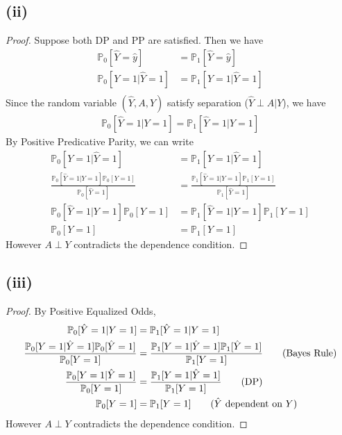 \documentclass[twoside,11pt]{homework}
\begin{document}
 \subsection*{(ii)}
 	\begin{proof}
 		Suppose both DP and PP are satisfied.
 		Then we have
 		\begin{align*}
 			\mathbb{P}_0[\hat{Y}=\hat{y}] &= \mathbb{P}_1 [\hat{Y}=\hat{y}] \tag{DP} \\
 			\mathbb{P}_0[Y=1 | \hat{Y}=1] &= \mathbb{P}_1[Y=1 | \hat{Y}=1] \tag{Positive PP} \\
 		\end{align*}
 		Since the random variable $(\hat{Y},A,Y)$ satisfy separation ($\hat{Y}\perp A|Y$), we have
 		\begin{align*}
 			\mathbb{P}_0[\hat{Y}=1|Y=1] = \mathbb{P}_1[\hat{Y}=1|Y=1]
 		\end{align*}
 		By Positive Predicative Parity, we can write
 		\begin{align*}
 			\mathbb{P}_0[Y=1 | \hat{Y}=1] &= \mathbb{P}_1[Y=1 | \hat{Y}=1] \\
 			\frac{\mathbb{P}_0[\hat{Y}=1|Y=1] \mathbb{P}_0[Y=1] }{\mathbb{P}_0[\hat{Y}=1] }
 			&= \frac{\mathbb{P}_1[\hat{Y}=1|Y=1] \mathbb{P}_1[Y=1] }{ \mathbb{P}_1[\hat{Y}=1] } \tag{Bayes Rule} \\
 			\mathbb{P}_0[\hat{Y}=1|Y=1] \mathbb{P}_0[Y=1] &= \mathbb{P}_1[\hat{Y}=1|Y=1] \mathbb{P}_1[Y=1] \tag{DP}\\
 			\mathbb{P}_0[Y=1] &= \mathbb{P}_1[Y=1] \tag{Separation Condition}
 		\end{align*}
 		However $A\perp Y$ contradicts the dependence condition.
 	\end{proof}
 \subsection*{(iii)}
 	\begin{proof}
 		By Positive Equalized Odds,
 		\begin{align*}
 			\mathbb{P}_0[ \hat{Y}=1|Y=1] &= \mathbb{P}_1[\hat{Y}=1|Y=1] \\
 			\frac{\mathbb{P}_0[Y=1|\hat{Y}=1] \mathbb{P}_0[\hat{Y}=1] }{\mathbb{P}_0[{Y}=1] }
 			&= \frac{\mathbb{P}_1[Y=1|\hat{Y}=1] \mathbb{P}_1[\hat{Y}=1] }{ \mathbb{P}_1[{Y}=1] } \tag{Bayes Rule} \\
 			\frac{\mathbb{P}_0[Y=1|\hat{Y}=1]}{\mathbb{P}_0[{Y}=1] }
 			&= \frac{\mathbb{P}_1[Y=1|\hat{Y}=1]}{ \mathbb{P}_1[{Y}=1] } \tag{DP}\\
 			\mathbb{P}_0[Y=1] &= \mathbb{P}_1[Y=1] \tag{$\hat{Y}$ dependent on $Y$}
 		\end{align*}
 		However $A\perp Y$ contradicts the dependence condition.
 	\end{proof}
\end{document}
